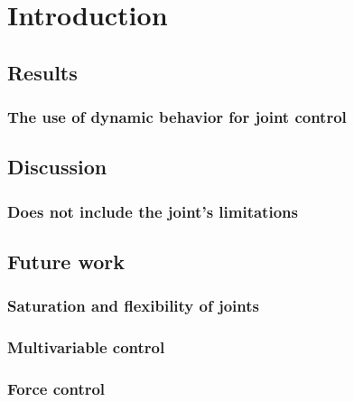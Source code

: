 \chapter{Introduction}

\section{Results}
\lipsum[1]
\subsection{The use of dynamic behavior for joint control}

\section{Discussion}
\lipsum[1]
\subsection{Does not include the joint's limitations}

\section{Future work}
\lipsum[1]
\subsection{Saturation and flexibility of joints}
\subsection{Multivariable control}
\subsection{Force control}